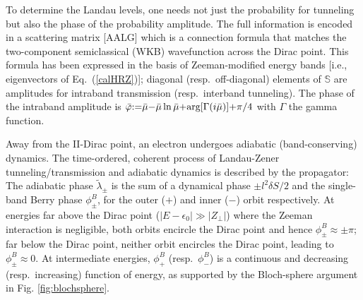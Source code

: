 \documentclass[aps, prb, showpacs, twocolumn, notitlepage, superscriptaddress]{revtex4-1}
\begin{document}
To determine the Landau levels, one needs not just the probability for tunneling but also the phase of the probability amplitude. The full information is encoded in a scattering matrix [AALG]
which is a connection formula that matches the two-component semiclassical (WKB) wavefunction across the Dirac point. This formula  has been expressed in the basis of Zeeman-modified energy bands [i.e., eigenvectors of Eq.\ (\ref{calHRZ})]; diagonal (resp.\ off-diagonal) elements of $\mathbb{S}$ are amplitudes for intraband transmission (resp.\ interband tunneling). The phase of the intraband amplitude is $\bar{\varphi}{:}{=}\bar{\mu}{-}\bar{\mu}\ln\bar{\mu}{+}\text{arg}[\Gamma(i\bar{\mu})]{+}\pi/4$ with $\Gamma$ the gamma function.

Away from the II-Dirac point, an electron undergoes adiabatic (band-conserving) dynamics. The time-ordered, coherent process of Landau-Zener tunneling/transmission and adiabatic dynamics is described by the propagator:
The adiabatic phase $\tilde{\lambda}_{\pm}$ is the sum of a dynamical phase ${\pm} l^2 \delta S/2$ and  the single-band Berry phase $\phi^B_\pm$, for the outer ($+$) and inner ($-$) orbit respectively. At energies far above the Dirac point ($|E{-}\epsilon_0|{\gg}|Z_{\perp}|$) where the Zeeman interaction is negligible, both orbits encircle the Dirac point and hence $\phi_{\pm}^B{\approx}{\pm}\pi$; far below the Dirac point, neither orbit encircles the Dirac point, leading to $\phi_{\pm}^B{\approx}0$. At intermediate energies, $\phi_{+}^B$ (resp.\ $\phi_{-}^B$) is a continuous and decreasing (resp.\ increasing) function of energy, as supported by the Bloch-sphere argument in Fig. \ref{fig:blochsphere}.



\end{document}
